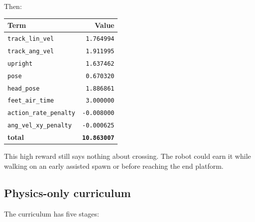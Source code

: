 \documentclass[
  american,
  11pt,
  letterpaper,
]{article}
\newcounter{none} %
\begin{document}
Then:

{\def\LTcaptype{none} %
\begin{longtable}[]{@{}lr@{}}
\toprule\noalign{}
Term & Value \\
\midrule\noalign{}
\endhead
\bottomrule\noalign{}
\endlastfoot
\texttt{track\_\allowbreak{}lin\_\allowbreak{}vel} &
\texttt{1.764994} \\
\texttt{track\_\allowbreak{}ang\_\allowbreak{}vel} &
\texttt{1.911995} \\
\texttt{upright} & \texttt{1.637462} \\
\texttt{pose} & \texttt{0.670320} \\
\texttt{head\_pose} & \texttt{1.886861} \\
\texttt{feet\_\allowbreak{}air\_\allowbreak{}time} &
\texttt{3.000000} \\
\texttt{action\_\allowbreak{}rate\_\allowbreak{}penalty} &
\texttt{-0.008000} \\
\texttt{ang\_\allowbreak{}vel\_\allowbreak{}xy\_\allowbreak{}penalty} &
\texttt{-0.000625} \\
\textbf{total} & \textbf{\texttt{10.863007}} \\
\end{longtable}
}

This high reward still says nothing about crossing. The robot could earn
it while walking on an early assisted spawn or before reaching the end
platform.

\subsection{Physics-only curriculum}\label{physics-only-curriculum}

The curriculum has five stages:
\end{document}
